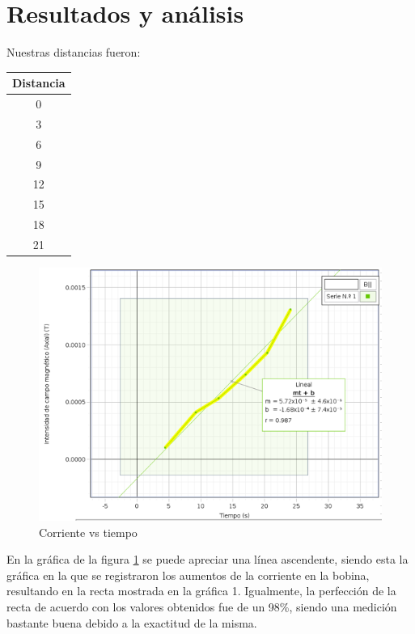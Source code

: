 \documentclass{article}
\begin{document}
\section{Resultados y análisis}\label{Resultados}			%
Nuestras distancias fueron:
\begin{table}[H]
\centering
\begin{tabular}{|c|}
\hline
Distancia \\
\hline
0 \\
3 \\
6 \\
9 \\
12 \\
15 \\
18 \\
21 \\
\hline
\end{tabular}
\end{table}

\begin{figure}[H]
   \centering
   \includegraphics[scale=0.4]{../imgs/a.png}
   \caption{Corriente vs tiempo}
   \label{Fig:1}
\end{figure}

En la gráfica de la figura \ref{Fig:1}
se puede apreciar una línea ascendente, siendo esta la gráfica en la que se registraron los aumentos de la corriente en la bobina, resultando en la recta mostrada en la gráfica 1.
Igualmente, la perfección de la recta de acuerdo con los valores obtenidos fue de un 98\%, siendo una medición bastante buena debido a la exactitud de la misma.
\end{document}

